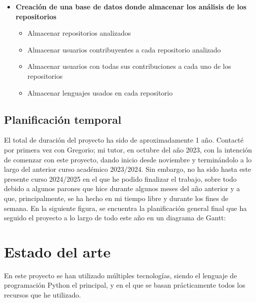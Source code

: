 \documentclass[a4paper, 12pt]{book}
\begin{document}
\begin{itemize}
\begin{itemize}
    \end{itemize}
  \item \textbf{Creación de una base de datos donde almacenar los análisis de los repositorios}
    \begin{itemize}
      \item Almacenar repositorios analizados
      \item Almacenar usuarios contribuyentes a cada repositorio analizado
      \item Almacenar usuarios con todas sus contribuciones a cada uno de los repositorios
      \item Almacenar lenguajes usados en cada repositorio
    \end{itemize}
\end{itemize}
\section{Planificación temporal}
\label{sec:planificacion-temporal}

El total de duración del proyecto ha sido de aproximadamente 1 año. Contacté por primera vez con Gregorio; mi tutor, en octubre del año 2023, con la intención de comenzar con este proyecto, dando inicio desde noviembre y terminándolo a lo largo del anterior curso académico 2023/2024. Sin embargo, no ha sido hasta este presente curso 2024/2025 en el que he podido finalizar el trabajo, sobre todo debido a algunos parones que hice durante algunos meses del año anterior y a que, principalmente, se ha hecho en mi tiempo libre y durante los fines de semana. En la siguiente figura, se encuentra la planificación general final que ha seguido el proyecto a lo largo de todo este año en un diagrama de Gantt:



\cleardoublepage
\chapter{Estado del arte}
\label{chap:estado}

En este proyecto se han utilizado múltiples tecnologías, siendo el lenguaje de programación Python el principal, y en el que se basan prácticamente todos los recursos que he utilizado.
\end{document}
